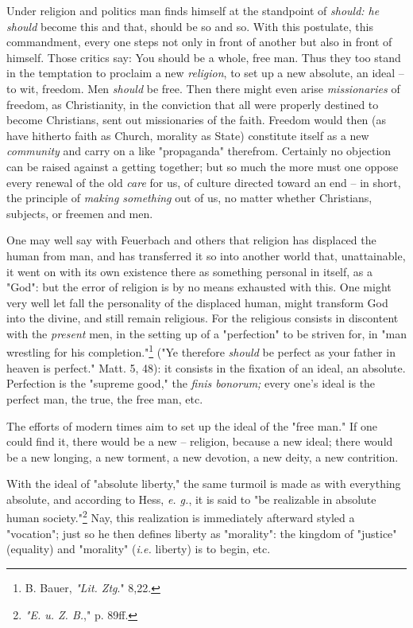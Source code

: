\documentclass[a4paper]{book}
\begin{document}
Under religion and politics man finds himself at the standpoint of 
\textit{should: he should} become this and that, should be so and so. With 
this postulate, this commandment, every one steps not only in front of another 
but also in front of himself. Those critics say: You should be a whole, free 
man. Thus they too stand in the temptation to proclaim a new 
\textit{religion}, to set up a new absolute, an ideal -- to wit, freedom. Men 
\textit{should} be free. Then there might even arise \textit{missionaries} of 
freedom, as Christianity, in the conviction that all were properly destined to 
become Christians, sent out missionaries of the faith. Freedom would then (as 
have hitherto faith as Church, morality as State) constitute itself as a new 
\textit{community} and carry on a like "{}propaganda"{} therefrom. Certainly 
no objection can be raised against a getting together; but so much the more 
must one oppose every renewal of the old \textit{care} for us, of culture 
directed toward an end -- in short, the principle of \textit{making something} 
out of us, no matter whether Christians, subjects, or freemen and men.

One may well say with Feuerbach and others that religion has displaced the 
human from man, and has transferred it so into another world that, 
unattainable, it went on with its own existence there as something personal in 
itself, as a "{}God"{}: but the error of religion is by no means exhausted 
with this. One might very well let fall the personality of the displaced 
human, might transform God into the divine, and still remain religious. For 
the religious consists in discontent with the \textit{present} men, in the 
setting up of a "{}perfection"{} to be striven for, in "{}man wrestling for 
his completion."{}\footnote{B. Bauer, \textit{"{}Lit. Ztg}."{} 8,22.} ("{}Ye 
therefore \textit{should} be perfect as your father in heaven is perfect."{} 
Matt. 5, 48): it consists in the fixation of an ideal, an absolute. Perfection 
is the "{}supreme good,"{} the \textit{finis bonorum;} every one's ideal is 
the perfect man, the true, the free man, etc.

The efforts of modern times aim to set up the ideal of the "{}free man."{} If 
one could find it, there would be a new -- religion, because a new ideal; 
there would be a new longing, a new torment, a new devotion, a new deity, a 
new contrition.

With the ideal of "{}absolute liberty,"{} the same turmoil is made as with 
everything absolute, and according to Hess, \textit{e. g.}, it is said to 
"{}be realizable in absolute human society."{}\footnote{\textit{"{}E. u. Z. 
B.},"{} p. 89ff.} Nay, this realization is immediately afterward styled a 
"{}vocation"{}; just so he then defines liberty as "{}morality"{}: the kingdom 
of "{}justice"{} (equality) and "{}morality"{} (\textit{i.e.} liberty) is to 
begin, etc.
\end{document}
